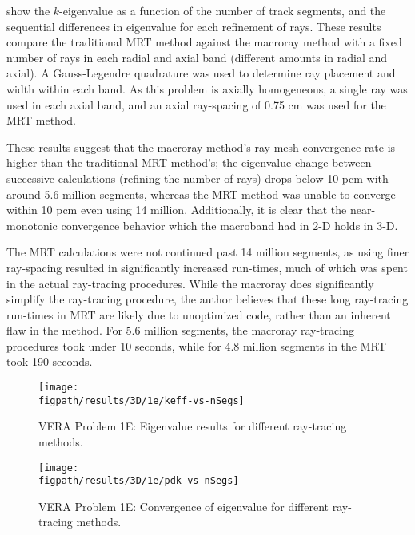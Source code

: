 {{{{         show the $k$-eigenvalue as a function of the number of track segments, and the sequential differences in eigenvalue for each refinement of rays.
        These results compare the traditional \ac{MRT} method against the macroray method with a fixed number of rays in each radial and axial band (different amounts in radial and axial).
        A Gauss-Legendre quadrature was used to determine ray placement and width within each band.
        As this problem is axially homogeneous, a single ray was used in each axial band, and an axial ray-spacing of 0.75 cm was used for the \ac{MRT} method.

        These results suggest that the macroray method's ray-mesh convergence rate is higher than the traditional \ac{MRT} method's;
          the eigenvalue change between successive calculations (refining the number of rays) drops below 10 pcm with around 5.6 million segments, whereas the \ac{MRT} method was unable to converge within 10 pcm even using 14 million.
        Additionally, it is clear that the near-monotonic convergence behavior which the macroband had in 2-D holds in 3-D.

        The \ac{MRT} calculations were not continued past 14 million segments, as using finer ray-spacing resulted in significantly increased run-times, much of which was spent in the actual ray-tracing procedures.
        While the macroray does significantly simplify the ray-tracing procedure, the author believes that these long ray-tracing run-times in \ac{MRT} are likely due to unoptimized code, rather than an inherent flaw in the method.
        For 5.6 million segments, the macroray ray-tracing procedures took under 10 seconds, while for 4.8 million segments in the \ac{MRT} took 190 seconds.

        \begin{figure}[htbp]
          \centering
          \texttt{[image: \\figpath/results/3D/1e/keff-vs-nSegs]}
          \caption{VERA Problem 1E: Eigenvalue results for different ray-tracing methods. \label{fig:MR:1e:3D:keff-vs-nSegs}}
        \end{figure}
        \begin{figure}[htbp]
          \centering
          \texttt{[image: \\figpath/results/3D/1e/pdk-vs-nSegs]}
          \caption{VERA Problem 1E: Convergence of eigenvalue for different ray-tracing methods. \label{fig:MR:1e:3D:pdf-vs-nSegs}}
        \end{figure}
      }
    }

}}
